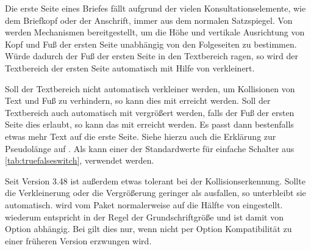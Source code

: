 \begin{Declaration}
\end{Declaration}
\begin{Explain}
  Die erste Seite eines Briefes fällt %
  \iftrue %
    aufgrund der vielen Konsultationselemente, wie dem Briefkopf oder der
    Anschrift,
  \fi %
  immer aus dem normalen Satzspiegel. Von \KOMAScript{} werden Mechanismen
  bereitgestellt, um die Höhe und vertikale Ausrichtung von Kopf und Fuß der
  ersten Seite unabhängig von den Folgeseiten zu bestimmen. Würde dadurch der
  Fuß der ersten Seite in den Textbereich ragen, so wird
  der Textbereich der ersten Seite automatisch mit Hilfe von
   verkleinert.
\end{Explain}
Soll der
Textbereich nicht automatisch verkleiner werden, um Kollisionen von Text und
Fuß zu verhindern, so kann dies mit %
 erreicht werden. Soll der
Textbereich auch automatisch mit  vergrößert werden,
falls der Fuß der ersten Seite dies erlaubt, so kann das mit
%
 erreicht werden. Es passt
dann bestenfalls etwas mehr Text auf die erste Seite.  Siehe hierzu auch die
Erklärung zur Pseudolänge  auf
. Als  kann
einer der Standardwerte für einfache Schalter aus
\autoref{tab:truefalseswitch},  verwendet
werden.

Seit Version 3.48
ist \KOMAScript{} außerdem etwas tolerant bei der Kollisionserkennung. Sollte
die Verkleinerung oder die Vergrößerung geringer als 
ausfallen, so unterbleibt sie automatisch.  wird vom Paket
 normalerweise auf die Hälfte von 
eingestellt.  wiederum entspricht in der Regel der
Grundschriftgröße und ist damit von Option
 abhängig. Bei  gilt dies
nur, wenn nicht per Option 
Kompatibilität zu einer früheren Version erzwungen wird.%
\EndIndexGroup


